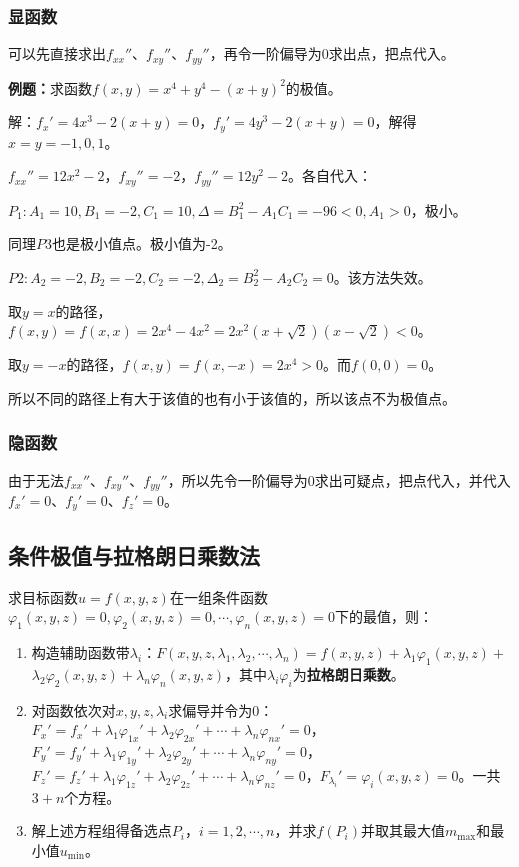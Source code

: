 \subsubsection{显函数}

可以先直接求出$f_{xx}''$、$f_{xy}''$、$f_{yy}''$，再令一阶偏导为0求出点，把点代入。

\textbf{例题：}求函数$f(x,y)=x^4+y^4-(x+y)^2$的极值。

解：$f_x'=4x^3-2(x+y)=0$，$f_y'=4y^3-2(x+y)=0$，解得$x=y=-1,0,1$。

$f_{xx}''=12x^2-2$，$f_{xy}''=-2$，$f_{yy}''=12y^2-2$。各自代入：

$P_1:A_1=10,B_1=-2,C_1=10,\Delta=B_1^2-A_1C_1=-96<0,A_1>0$，极小。

同理$P3$也是极小值点。极小值为-2。

$P2:A_2=-2,B_2=-2,C_2=-2,\Delta_2=B_2^2-A_2C_2=0$。该方法失效。

取$y=x$的路径，$f(x,y)=f(x,x)=2x^4-4x^2=2x^2(x+\sqrt{2})(x-\sqrt{2})<0$。

取$y=-x$的路径，$f(x,y)=f(x,-x)=2x^4>0$。而$f(0,0)=0$。

所以不同的路径上有大于该值的也有小于该值的，所以该点不为极值点。

\subsubsection{隐函数}

由于无法$f_{xx}''$、$f_{xy}''$、$f_{yy}''$，所以先令一阶偏导为0求出可疑点，把点代入，并代入$f_x'=0$、$f_y'=0$、$f_z'=0$。

\subsection{条件极值与拉格朗日乘数法}

求目标函数$u=f(x,y,z)$在一组条件函数$\varphi_1(x,y,z)=0,\varphi_2(x,y,z)=0,\cdots,\varphi_n(x,y,z)=0$下的最值，则：

\begin{enumerate}
    \item 构造辅助函数带$\lambda_i$：$F(x,y,z,\lambda_1,\lambda_2,\cdots,\lambda_n)=f(x,y,z)+\lambda_1\varphi_1(x,y,z)+$\\$\lambda_2\varphi_2(x,y,z)+\lambda_n\varphi_n(x,y,z)$，其中$\lambda_i\varphi_i$为\textbf{拉格朗日乘数}。
    \item 对函数依次对$x,y,z,\lambda_i$求偏导并令为0：$F_x'=f_x'+\lambda_1\varphi_{1x}'+\lambda_2\varphi_{2x}'+\cdots+\lambda_n\varphi_{nx}'=0$，$F_y'=f_y'+\lambda_1\varphi_{1y}'+\lambda_2\varphi_{2y}'+\cdots+\lambda_n\varphi_{ny}'=0$，$F_z'=f_z'+\lambda_1\varphi_{1z}'+\lambda_2\varphi_{2z}'+\cdots+\lambda_n\varphi_{nz}'=0$，$F_{\lambda_i}'=\varphi_i(x,y,z)=0$。一共$3+n$个方程。
    \item 解上述方程组得备选点$P_i$，$i=1,2,\cdots,n$，并求$f(P_i)$并取其最大值$m_{\max}$和最小值$u_{\min}$。
\end{enumerate}


